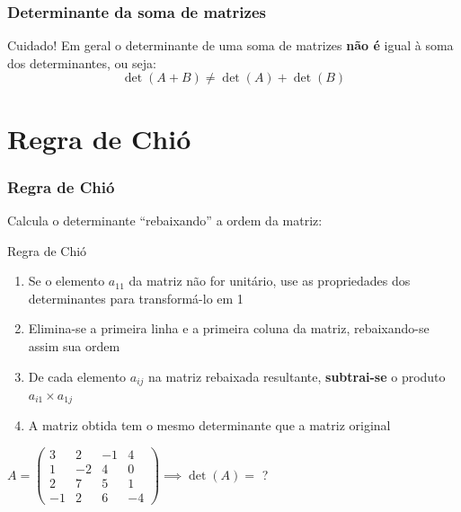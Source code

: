 \documentclass[pdftex, brazil, aspectratio=169]{beamer}
\begin{document}
\begin{frame}[t]
  \frametitle{Determinante da soma de matrizes}
  \begin{alertblock}{Cuidado!}
    Em geral o determinante de uma soma de matrizes \textbf{não é} igual à soma
    dos determinantes, ou seja: $$\det(A + B) \ne \det(A) + \det(B)$$
  \end{alertblock}

\end{frame}


\section{Regra de Chió}

\begin{frame}[t]
  \frametitle{Regra de Chió}
  Calcula o determinante ``rebaixando'' a ordem da matriz:
  \begin{block}{Regra de Chió}
    \begin{enumerate}
      \item Se o elemento $a_{11}$ da matriz não for unitário, use as
        propriedades dos determinantes para transformá-lo em 1
      \item Elimina-se a primeira linha e a primeira coluna da matriz,
        rebaixando-se assim sua ordem
      \item De cada elemento $a_{ij}$ na matriz rebaixada resultante,
        \textbf{subtrai-se} o produto $a_{i1} \times a_{1j}$
      \item A matriz obtida tem o mesmo determinante que a matriz original
    \end{enumerate}
  \end{block}
  $A = \begin{pmatrix}
    3 & 2 & -1 & 4\\
    1 & -2 & 4 & 0\\
    2 & 7 & 5 & 1\\
    -1 & 2 & 6 & -4\end{pmatrix} \implies \det(A) = $ ?
\end{frame}
\end{document}

